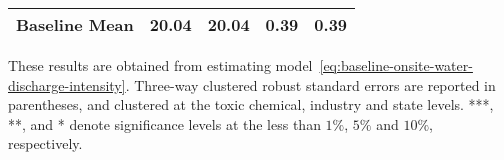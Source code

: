 \begin{table}[H]
{\begin{tabular}{@{}lllll@{}}
            Baseline Mean      & 20.04     & 20.04     & 0.39      & 0.39      \\ \bottomrule\bottomrule
        \end{tabular}%
    }
    \begin{minipage}{18cm}
        \vspace{0.05in}
        These results are obtained from estimating model~\ref{eq:baseline-onsite-water-discharge-intensity}. Three-way clustered robust standard errors are reported in parentheses, and clustered at the toxic chemical, industry and state levels. ***, **, and * denote significance levels at the less than $1\%$, $5\%$ and $10\%$, respectively.
    \end{minipage}
\end{table}